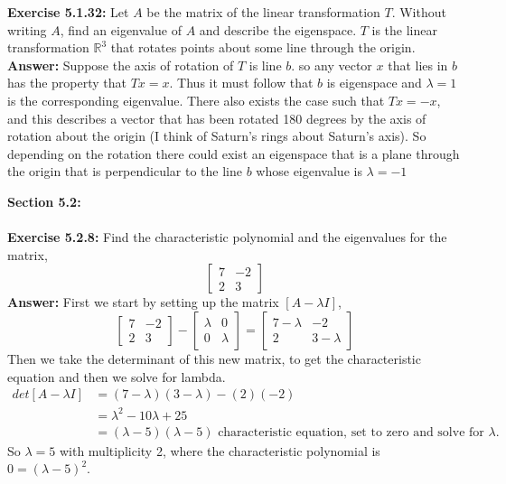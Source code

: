 \documentclass{amsart}
\def\RR{{\mathbb R}}
\begin{document}
\noindent\textbf{Exercise 5.1.32: } Let $A$ be the matrix of the linear transformation $T$. Without writing $A$, find an eigenvalue of $A$ and describe the eigenspace. $T$ is the linear transformation $\RR^{3}$ that rotates points about some line through the origin.\\
\noindent \textbf{Answer: } Suppose the axis of rotation of $T$ is line $b$. so any vector $x$ that lies in $b$ has the property that $Tx = x$. Thus it must follow that $b$ is eigenspace and $\lambda = 1$ is the corresponding eigenvalue. There also exists the case such that $Tx = -x$, and this describes a vector that has been rotated 180 degrees by the axis of rotation about the origin (I think of Saturn's rings about Saturn's axis). So depending on the rotation there could exist an eigenspace that is a plane through the origin that is perpendicular to the line $b$ whose eigenvalue is $\lambda = -1$
\vspace{1in}



{\huge\textbf{Section 5.2:}}\\\\


\noindent\textbf{Exercise 5.2.8: } Find the characteristic polynomial and the eigenvalues for the matrix,
\begin{equation*}
\begin{bmatrix}
7 &-2\\
2& 3
\end{bmatrix}
\end{equation*}
\noindent \textbf{Answer: } First we start by setting up the matrix $[A - \lambda I]$,
\begin{equation*}
\begin{bmatrix}
7 &-2\\
2& 3
\end{bmatrix}
- 
\begin{bmatrix}
\lambda&0\\
0& \lambda
\end{bmatrix}
 = 
 \begin{bmatrix}
7 - \lambda  &-2 \\
2& 3 - \lambda
\end{bmatrix}
\end{equation*}
Then we take the determinant of this new matrix, to get the characteristic equation and then we solve for lambda.
\begin{align*}
det[A - \lambda I] &= (7 - \lambda)(3  - \lambda) - (2)(-2)\\
&=\lambda^2 -10\lambda + 25\\
&=(\lambda - 5)(\lambda - 5) \text{ characteristic equation, set to zero and solve for $\lambda$.}
\end{align*}
So $\lambda = 5$ with multiplicity 2, where the characteristic polynomial is $0 =(\lambda - 5)^2$.
\vspace{1in}
\end{document}
